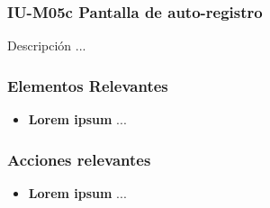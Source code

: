 
\subsubsection{IU-M05c Pantalla de auto-registro}

 Descripción ...


\subsubsection{Elementos Relevantes}

    \begin{itemize}
    \item {\bf Lorem ipsum}
        ...
    \end{itemize}

\subsubsection{Acciones relevantes}

    \begin{itemize}
    \item {\bf Lorem ipsum}
        ...
    \end{itemize}

\clearpage
